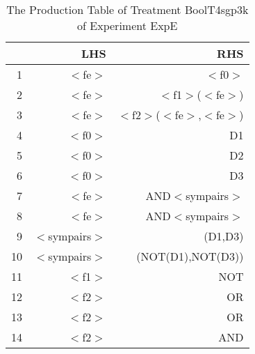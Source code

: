 \begin{table}[ht]
\centering
\begin{tabular}{rrr}
  \hline
 & LHS & RHS \\ 
  \hline
1 & $<$fe$>$ & $<$f0$>$ \\ 
  2 & $<$fe$>$ & $<$f1$>$($<$fe$>$) \\ 
  3 & $<$fe$>$ & $<$f2$>$($<$fe$>$,$<$fe$>$) \\ 
  4 & $<$f0$>$ & D1 \\ 
  5 & $<$f0$>$ & D2 \\ 
  6 & $<$f0$>$ & D3 \\ 
  7 & $<$fe$>$ & AND$<$sympairs$>$ \\ 
  8 & $<$fe$>$ & AND$<$sympairs$>$ \\ 
  9 & $<$sympairs$>$ & (D1,D3) \\ 
  10 & $<$sympairs$>$ & (NOT(D1),NOT(D3)) \\ 
  11 & $<$f1$>$ & NOT \\ 
  12 & $<$f2$>$ & OR \\ 
  13 & $<$f2$>$ & OR \\ 
  14 & $<$f2$>$ & AND \\ 
   \hline
\end{tabular}
\caption{The Production Table of Treatment BoolT4sgp3k of Experiment ExpE} 
\end{table}
